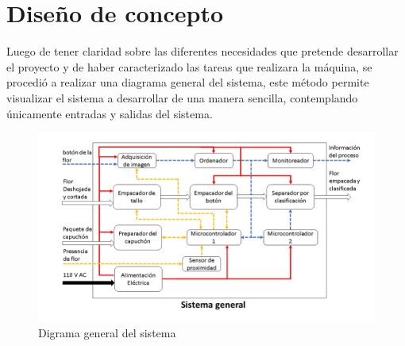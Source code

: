 \section{Diseño de concepto}
Luego de tener claridad sobre las diferentes necesidades que pretende desarrollar el
proyecto y de haber caracterizado las tareas que realizara la máquina, se procedió a
realizar una diagrama general del sistema, este método permite visualizar el sistema a desarrollar de una
manera sencilla, contemplando únicamente entradas y salidas del sistema.
\begin{figure}[H]
	\centering
	\includegraphics[scale=0.5]{Figuras/SistemaGeneral}
	\caption{Digrama general del sistema}
	\label{fig:dGeneral}
\end{figure}

